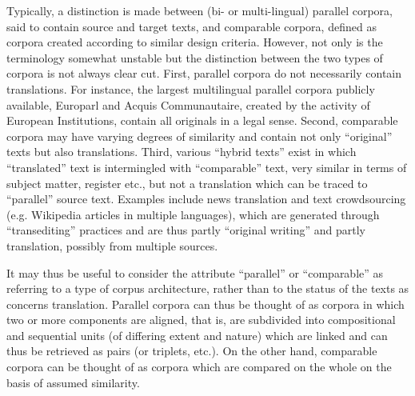 \documentclass[output=paper]{LSP/langsci}
\begin{document}
Typically, a distinction is made between (bi- or multi-lingual) parallel corpora, said to contain source and target texts, and comparable corpora, defined as corpora created according to similar design criteria. However, not only is the terminology somewhat unstable \citep[149]{Zanettin2012} but the distinction between the two types of corpora is not always clear cut. First, parallel corpora do not necessarily contain translations. For instance, the largest multilingual parallel corpora publicly available, Europarl and Acquis Communautaire, created by the activity of European Institutions, contain all originals in a legal sense. Second, comparable corpora may have varying degrees of similarity and contain not only “original” texts but also translations. Third, various “hybrid texts” exist in which “translated” text is intermingled with “comparable” text, very similar in terms of subject matter, register etc., but not a translation which can be traced to “parallel” source text. Examples include news translation and text crowdsourcing (e.g. Wikipedia articles in multiple languages), which are generated through “transediting” \citep{Stetting1989} practices and are thus partly “original writing” and partly translation, possibly from multiple sources. 

It may thus be useful to consider the attribute “parallel” or “comparable” as referring to a type of corpus architecture, rather than to the status of the texts as concerns translation. Parallel corpora can thus be thought of as corpora in which two or more components are aligned, that is, are subdivided into compositional and sequential units (of differing extent and nature) which are linked and can thus be retrieved as pairs (or triplets, etc.). On the other hand, comparable corpora can be thought of as corpora which are compared on the whole on the basis of assumed similarity.
\end{document}
